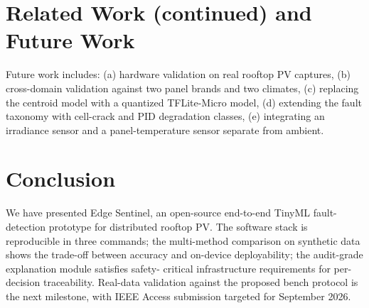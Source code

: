 \documentclass[12pt,journal,onecolumn]{IEEEtran}
\begin{document}
\section{Related Work (continued) and Future Work}
\label{sec:future}

Future work includes: (a) hardware validation on real rooftop PV
captures, (b) cross-domain validation against two panel brands and two
climates, (c) replacing the centroid model with a quantized TFLite-Micro
model, (d) extending the fault taxonomy with cell-crack and PID
degradation classes, (e) integrating an irradiance sensor and a
panel-temperature sensor separate from ambient.

\section{Conclusion}
\label{sec:conclusion}

We have presented Edge Sentinel, an open-source end-to-end TinyML
fault-detection prototype for distributed rooftop PV. The software
stack is reproducible in three commands; the multi-method comparison
on synthetic data shows the trade-off between accuracy and on-device
deployability; the audit-grade explanation module satisfies safety-
critical infrastructure requirements for per-decision traceability.
Real-data validation against the proposed bench protocol is the next
milestone, with IEEE Access submission targeted for September 2026.
\end{document}
